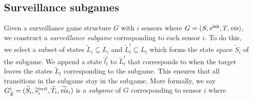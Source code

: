 \subsection{Surveillance subgames}
Given a surveillance game structure $G$ with $i$ sensors where $G = (S,s^{\mathsf{init}},T,\mathit{vis})$, we construct a \emph{surveillance subgame} corresponding to each sensor $i$. To do this, we select a subset of states $\widetilde{L}_i \subseteq L_i$ and $\widetilde{L}^i_t \subseteq L_t$ which forms the state space $\widetilde{S}_i$ of the subgame. We append a state $\hat{l}^i_t$ to $\widetilde{L}^i_t$ that corresponds to when the target leaves the states $\widetilde{L}_t$ corresponding to the subgame. This ensures that all transitions in the subgame stay in the subgame. More formally, we say $G^{i}_{\hat{S}} = (\widetilde{S}_i,\widetilde{s}_i^{init},\widetilde{T}_i,\widetilde{\mathit{vis}}_i)$ is a \emph{subgame} of $G$ corresponding to sensor $i$ where 

